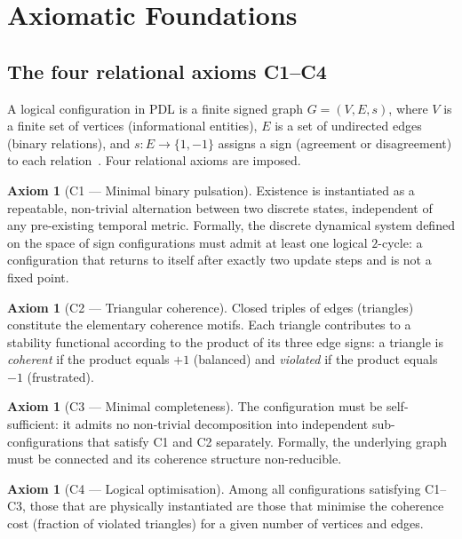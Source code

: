 \documentclass[11pt,a4paper]{article}
\theoremstyle{plain}
\theoremstyle{definition}
\newtheorem{axiom}[theorem]{Axiom}
\theoremstyle{remark}
\begin{document}
\section{Axiomatic Foundations}
\label{sec:axioms}

\subsection{The four relational axioms C1--C4}
\label{subsec:axioms}
A logical configuration in PDL is a finite signed graph $G=(V,E,s)$, where $V$ is a finite set of vertices (informational entities), $E$ is a set of undirected edges (binary relations), and $s\colon E\to\{1,-1\}$ assigns a sign (agreement or disagreement) to each relation~\cite{D01,D02}. Four relational axioms are imposed.

\begin{axiom}[C1 --- Minimal binary pulsation]
Existence is instantiated as a repeatable, non-trivial alternation between two discrete states, independent of any pre-existing temporal metric. Formally, the discrete dynamical system defined on the space of sign configurations must admit at least one logical $2$-cycle: a configuration that returns to itself after exactly two update steps and is not a fixed point.
\end{axiom}

\begin{axiom}[C2 --- Triangular coherence]
Closed triples of edges (triangles) constitute the elementary coherence motifs. Each triangle contributes to a stability functional according to the product of its three edge signs: a triangle is \emph{coherent} if the product equals $+1$ (balanced) and \emph{violated} if the product equals $-1$ (frustrated).
\end{axiom}

\begin{axiom}[C3 --- Minimal completeness]
The configuration must be self-sufficient: it admits no non-trivial decomposition into independent sub-configurations that satisfy C1 and C2 separately. Formally, the underlying graph must be connected and its coherence structure non-reducible.
\end{axiom}

\begin{axiom}[C4 --- Logical optimisation]
Among all configurations satisfying C1--C3, those that are physically instantiated are those that minimise the coherence cost (fraction of violated triangles) for a given number of vertices and edges.
\end{axiom}
\end{document}
